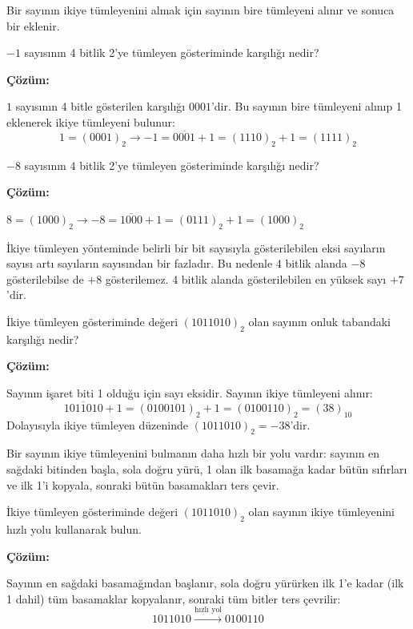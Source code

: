 Bir sayının ikiye tümleyenini almak için sayının bire tümleyeni alınır ve sonuca bir eklenir.

\begin{ornek}[A.12]
$-1$ sayısının 4 bitlik 2'ye tümleyen gösteriminde karşılığı nedir?

\textbf{Çözüm:}

$1$ sayısının 4 bitle gösterilen karşılığı $0001$'dir. Bu sayının bire tümleyeni alınıp 1 eklenerek ikiye tümleyeni bulunur:
\[
1 = (0001)_2 \rightarrow -1 = \overline{0001} + 1 = (1110)_2 + 1 = (1111)_2
\]
\end{ornek}

\begin{ornek}[A.13]
$-8$ sayısının 4 bitlik 2'ye tümleyen gösteriminde karşılığı nedir?

\textbf{Çözüm:}

$8 = (1000)_2 \rightarrow -8 = \overline{1000} + 1 = (0111)_2 + 1 = (1000)_2$

İkiye tümleyen yönteminde belirli bir bit sayısıyla gösterilebilen eksi sayıların sayısı artı sayıların sayısından bir fazladır. Bu nedenle 4 bitlik alanda $-8$ gösterilebilse de $+8$ gösterilemez. 4 bitlik alanda gösterilebilen en yüksek sayı $+7$'dir.
\end{ornek}

\begin{ornek}[A.14]
İkiye tümleyen gösteriminde değeri $(1011010)_2$ olan sayının onluk tabandaki karşılığı nedir?

\textbf{Çözüm:}

Sayının işaret biti 1 olduğu için sayı eksidir. Sayının ikiye tümleyeni alınır:
\[
\overline{1011010} + 1 = (0100101)_2 + 1 = (0100110)_2 = (38)_{10}
\]
Dolayısıyla ikiye tümleyen düzeninde $(1011010)_2 = -38$'dir.
\end{ornek}

Bir sayının ikiye tümleyenini bulmanın daha hızlı bir yolu vardır: sayının en sağdaki bitinden başla, sola doğru yürü, 1 olan ilk basamağa kadar bütün sıfırları ve ilk 1'i kopyala, sonraki bütün basamakları ters çevir.

\begin{ornek}[A.15]
İkiye tümleyen gösteriminde değeri $(1011010)_2$ olan sayının ikiye tümleyenini hızlı yolu kullanarak bulun.

\textbf{Çözüm:}

Sayının en sağdaki basamağından başlanır, sola doğru yürürken ilk 1'e kadar (ilk 1 dahil) tüm basamaklar kopyalanır, sonraki tüm bitler ters çevrilir:
\[
1011010 \xrightarrow{\text{hızlı yol}} 0100110
\]
\end{ornek}

